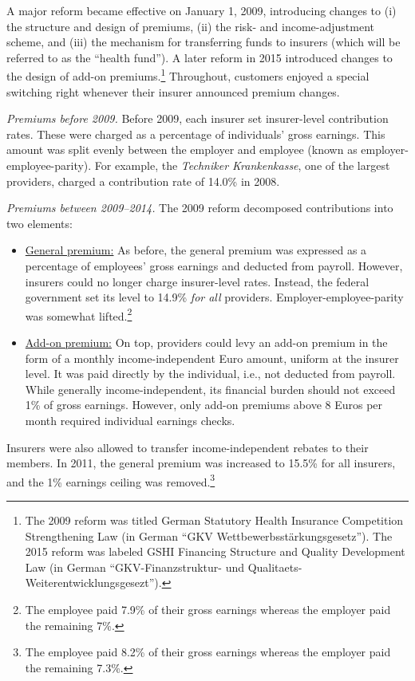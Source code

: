 \documentclass[a4paper, 11pt, english]{article}
\begin{document}
A major reform became effective on January 1, 2009, introducing changes to (i) the structure and design of premiums, (ii) the risk- and income-adjustment scheme, and (iii) the mechanism for transferring funds to insurers (which will be referred to as the ``health fund''). A later reform in 2015 introduced changes to the design of add-on premiums.\footnote{The 2009 reform was titled German Statutory Health Insurance Competition Strengthening Law (in German ``GKV Wettbewerbsstärkungsgesetz''). The 2015 reform was labeled GSHI Financing Structure and Quality Development Law (in German ``GKV-Finanzstruktur- und Qualitaets-Weiterentwicklungsgesezt'').} Throughout, customers enjoyed a special switching right whenever their insurer announced premium changes.

\textit{Premiums before 2009.} Before 2009, each insurer set insurer-level contribution rates. These were charged as a percentage of individuals' gross earnings. This amount was split evenly between the employer and employee (known as employer-employee-parity). For example, the \textit{Techniker Krankenkasse}, one of the largest providers, charged a contribution rate of 14.0\% in 2008.

\textit{Premiums between 2009--2014.} The 2009 reform decomposed contributions into two elements:
\begin{itemize}[noitemsep, topsep=0pt]
	\item \underline{General premium:} As before, the general premium was expressed as a percentage of employees' gross earnings and deducted from payroll. However, insurers could no longer charge insurer-level rates. Instead, the federal government set its level to 14.9\% \textit{for all} providers. Employer-employee-parity was somewhat lifted.\footnote{The employee paid 7.9\% of their gross earnings whereas the employer paid the remaining 7\%.} 
	\item \underline{Add-on premium:} On top, providers could levy an add-on premium in the form of a monthly income-independent Euro amount, uniform at the insurer level. It was paid directly by the individual, i.e., not deducted from payroll. While generally income-independent, its financial burden should not exceed 1\% of gross earnings. However, only add-on premiums above 8 Euros per month required individual earnings checks.
\end{itemize}
Insurers were also allowed to transfer income-independent rebates to their members. In 2011, the general premium was increased to 15.5\% for all insurers, and the 1\% earnings ceiling was removed.\footnote{The employee paid 8.2\% of their gross earnings whereas the employer paid the remaining 7.3\%.} 
\end{document}

